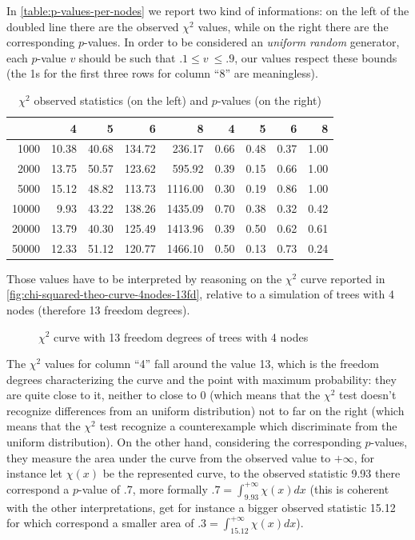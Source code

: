 In \autoref{table:p-values-per-nodes} we report two kind of
informations: on the left of the doubled line there are the observed
$\chi^2$ values, while on the right there are the corresponding
$p$-values. In order to be considered an \emph{uniform random}
generator, each $p$-value $v$ should be such that $.1 \leq v\ \leq
.9$, our values respect these bounds (the 1s for the first three rows
for column ``8'' are meaningless).
\begin{table}[ht]
  \begin{center}
    \begin{tabular}{r|rrrr||rrrr}
      \hline
      & 4 & 5 & 6 & 8 & 4 & 5 & 6 & 8 \\ 
      \hline
      1000 & 10.38 & 40.68 & 134.72 & 236.17 & 0.66 & 0.48 & 0.37 & 1.00 \\  
      2000 & 13.75 & 50.57 & 123.62 & 595.92 & 0.39 & 0.15 & 0.66 & 1.00 \\ 
      5000 & 15.12 & 48.82 & 113.73 & 1116.00 & 0.30 & 0.19 & 0.86 & 1.00 \\ 
      10000 & 9.93 & 43.22 & 138.26 & 1435.09 & 0.70 & 0.38 & 0.32 & 0.42 \\ 
      20000 & 13.79 & 40.30 & 125.49 & 1413.96 & 0.39 & 0.50 & 0.62 & 0.61 \\
      50000 & 12.33 & 51.12 & 120.77 & 1466.10 & 0.50 & 0.13 & 0.73 & 0.24 \\
      \hline
    \end{tabular}
    \caption{$\chi^2$ observed statistics (on the left) and $p$-values
      (on the right)}
    \label{table:p-values-per-nodes}
  \end{center}
\end{table}
Those values have to be interpreted by reasoning on the $\chi^2$ curve
reported in \autoref{fig:chi-squared-theo-curve-4nodes-13fd}, relative
to a simulation of trees with 4 nodes (therefore 13 freedom degrees).
\begin{figure}[htb]
  \centering
  \caption{$\chi^2$ curve with 13 freedom degrees of trees with 4
    nodes}
  \label{fig:chi-squared-theo-curve-4nodes-13fd}
\end{figure}
The $\chi^2$ values for column ``4'' fall around the value 13, which
is the freedom degrees characterizing the curve and the point with
maximum probability: they are quite close to it, neither to close to 0
(which means that the $\chi^2$ test doesn't recognize differences from
an uniform distribution) not to far on the right (which means that the
$\chi^2$ test recognize a counterexample which discriminate from the
uniform distribution). On the other hand, considering the
corresponding $p$-values, they measure the area under the curve from
the observed value to $+\infty$, for instance let $\chi(x)$ be the
represented curve, to the observed statistic 9.93 there correspond a
$p$-value of .7, more formally $.7 = \int_{9.93}^{+\infty}{\chi(x)dx}$
(this is coherent with the other interpretations, get for instance a
bigger observed statistic 15.12 for which correspond a smaller area of
$.3 = \int_{15.12}^{+\infty}{\chi(x)dx}$).


